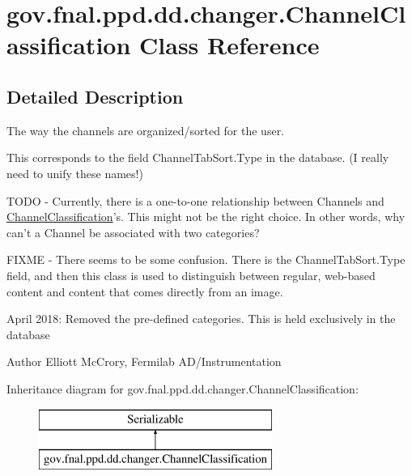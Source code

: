 \hypertarget{classgov_1_1fnal_1_1ppd_1_1dd_1_1changer_1_1ChannelClassification}{\section{gov.\-fnal.\-ppd.\-dd.\-changer.\-Channel\-Classification Class Reference}
\label{classgov_1_1fnal_1_1ppd_1_1dd_1_1changer_1_1ChannelClassification}
}


\subsection{Detailed Description}
The way the channels are organized/sorted for the user.

This corresponds to the field Channel\-Tab\-Sort.\-Type in the database. (I really need to unify these names!)

T\-O\-D\-O -\/ Currently, there is a one-\/to-\/one relationship between Channels and \hyperlink{classgov_1_1fnal_1_1ppd_1_1dd_1_1changer_1_1ChannelClassification}{Channel\-Classification}'s. This might not be the right choice. In other words, why can't a Channel be associated with two categories?

F\-I\-X\-M\-E -\/ There seems to be some confusion. There is the Channel\-Tab\-Sort.\-Type field, and then this class is used to distinguish between regular, web-\/based content and content that comes directly from an image.

April 2018\-: Removed the pre-\/defined categories. This is held exclusively in the database

\begin{DoxyAuthor}{Author}
Elliott Mc\-Crory, Fermilab A\-D/\-Instrumentation 
\end{DoxyAuthor}
Inheritance diagram for gov.\-fnal.\-ppd.\-dd.\-changer.\-Channel\-Classification\-:\begin{figure}[H]
\begin{center}
\leavevmode
\includegraphics[height=2.000000cm]{classgov_1_1fnal_1_1ppd_1_1dd_1_1changer_1_1ChannelClassification}
\end{center}
\end{figure}
